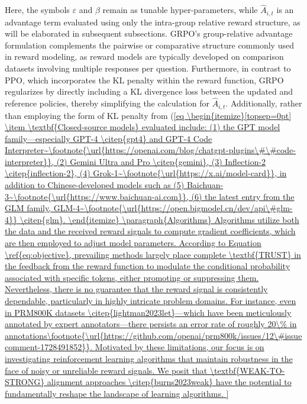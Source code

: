 Here, the symbols $\varepsilon$ and $\beta$ remain as tunable hyper-parameters, while $\hat{A}_{i,t}$ is an advantage term evaluated using only the intra-group relative reward structure, as will be elaborated in subsequent subsections. GRPO's group-relative advantage formulation complements the pairwise or comparative structure commonly used in reward modeling, as reward models are typically developed on comparison datasets involving multiple responses per question. Furthermore, in contrast to PPO, which incorporates the KL penalty within the reward function, GRPO regularizes by directly including a KL divergence loss between the updated and reference policies, thereby simplifying the calculation for $\hat{A}_{i,t}$. Additionally, rather than employing the form of KL penalty from (\ref{eq

\begin{itemize}[topsep=0pt]
    \item \textbf{Closed-source models} evaluated include: (1) the GPT model family—especially GPT-4 \citep{gpt4} and GPT-4 Code Interpreter~\footnote{\url{https://openai.com/blog/chatgpt-plugins\#\#code-interpreter}}, (2) Gemini Ultra and Pro \citep{gemini}, (3) Inflection-2 \citep{inflection-2}, (4) Grok-1~\footnote{\url{https://x.ai/model-card}}, in addition to Chinese-developed models such as (5) Baichuan-3~\footnote{\url{https://www.baichuan-ai.com}}, (6) the latest entry from the GLM family, GLM-4~\footnote{\url{https://open.bigmodel.cn/dev/api\#glm-4}} \citep{glm}.
\end{itemize}

\paragraph{Algorithms} Algorithms utilize both the data and the received reward signals to compute gradient coefficients, which are then employed to adjust model parameters. According to Equation \ref{eq:objective}, prevailing methods largely place complete \textbf{TRUST} in the feedback from the reward function to modulate the conditional probability associated with specific tokens, either promoting or suppressing them. Nevertheless, there is no guarantee that the reward signal is consistently dependable, particularly in highly intricate problem domains. For instance, even in PRM800K datasets \citep{lightman2023let}—which have been meticulously annotated by expert annotators—there persists an error rate of roughly 20\% in annotations\footnote{\url{https://github.com/openai/prm800k/issues/12\#issuecomment-1728491852}}. Motivated by these limitations, our focus is on investigating reinforcement learning algorithms that maintain robustness in the face of noisy or unreliable reward signals. We posit that \textbf{WEAK-TO-STRONG} alignment approaches \citep{burns2023weak} have the potential to fundamentally reshape the landscape of learning algorithms.

}
